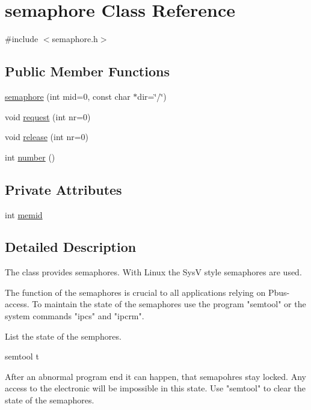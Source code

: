 \hypertarget{classsemaphore}{\section{semaphore Class Reference}
\label{classsemaphore}
}


{\ttfamily \#include $<$semaphore.\-h$>$}

\subsection*{Public Member Functions}
\begin{DoxyCompactItemize}
\item 
\hyperlink{classsemaphore_a31507ed70a3da29a101b37c5cb9e286e}{semaphore} (int mid=0, const char $\ast$dir=\char`\"{}/\char`\"{})
\item 
void \hyperlink{classsemaphore_a7fabe8758afc2f2b3f62c45514ab1b6a}{request} (int nr=0)
\item 
void \hyperlink{classsemaphore_a1979f4ba3834a6e12fd32ceca4e9d261}{release} (int nr=0)
\item 
int \hyperlink{classsemaphore_a2e79d2e0e2ce47d698f51ecc91b76b39}{number} ()
\end{DoxyCompactItemize}
\subsection*{Private Attributes}
\begin{DoxyCompactItemize}
\item 
int \hyperlink{classsemaphore_a64fc11fb8a84ceb95e510829795ed996}{memid}
\end{DoxyCompactItemize}


\subsection{Detailed Description}
\begin{DoxyVerb}The class provides semaphores.
With Linux the SysV style semaphores are used.

The function of the semaphores is crucial to all applications
relying on Pbus-access. To maintain the state of the semaphores
use the program "semtool" or the system commands "ipcs" and "ipcrm".

List the state of the semphores.
\end{DoxyVerb}
 \begin{DoxyVerb}semtool t\end{DoxyVerb}
 \begin{DoxyVerb}After an abnormal program end it can happen, that semapohres stay
locked. Any access to the electronic will be impossible in this state.
Use "semtool" to clear the state of the semaphores.
\end{DoxyVerb}
 \begin{DoxyVerb}\end{DoxyVerb}


